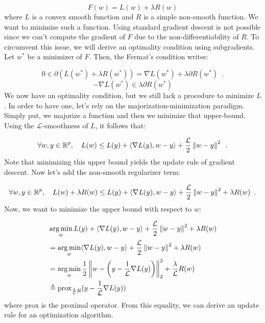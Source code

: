 \documentclass[a4paper,10pt]{article}
\theoremstyle{definition}
\begin{document}
\begin{equation*}
    F(w) = L(w) + \lambda R(w)
\end{equation*}
%
where $L$ is a convex smooth function and $R$ is a simple non-smooth function. We want to
minimize such a function. Using standard gradient descent is not possible since we can't compute the
gradient of $F$ due to the non-differentiability of $R$. To circumvent this issue, we will derive an
optimality condition using subgradients. Let $w^*$ be a minimizer of $F$. Then, the Fermat's condition
writes:

\begin{equation*}
    0 \in \partial 
    \left(
        L(w^*) + \lambda R(w^*)
    \right) 
    = \nabla L(w^*) + \lambda \partial R(w^*)
    \enspace .
\end{equation*}
%
\begin{equation*}
    - \nabla L(w^*) \in \lambda \partial R(w^*)
\end{equation*}
%
We now have an optimality condition, but we still lack a procedure to minimize $L$. 
In order to have one, let's rely on the majorization-minimization paradigm. Simply put, 
we majorize a function and then we minimize that upper-bound. Using the $\mathcal{L}$-smoothness
of $L$, it follows that:

\begin{equation*}
    \forall w, y \in \mathbb{R}^p,
    \quad
    L(w) \leq L(y) + 
    \langle
        \nabla L(y),
        w-y
    \rangle +
    \frac{\mathcal{L}}{2} 
    \left \lVert w - y \right \rVert^2
    \enspace .
\end{equation*}
%
Note that minimizing this upper bound yields the update rule of gradient descent. Now let's add
the non-smooth regularizer term:

\begin{equation*}
    \forall w, y \in \mathbb{R}^p,
    \quad
    L(w) + \lambda R(w) \leq L(y) + 
    \langle
        \nabla L(y),
        w-y
    \rangle +
    \frac{\mathcal{L}}{2} 
    \left \lVert w - y \right \rVert^2 
    + \lambda R(w) 
    \enspace .
\end{equation*}
%
Now, we want to minimize the upper bound with respect to $w$:

\begin{align*}
    &\operatorname*{arg\,min}_{w} L(y) + 
    \langle
        \nabla L(y),
        w-y
    \rangle +
    \frac{\mathcal{L}}{2} 
    \left \lVert w - y \right \rVert^2 
    + \lambda R(w) \\
    &= \operatorname*{arg\,min}_{w}
    \langle
        \nabla L(y),
        w-y
    \rangle +
    \frac{\mathcal{L}}{2} 
    \left \lVert w - y \right \rVert^2 
    + \lambda R(w) \\
    &= \operatorname*{arg\,min}_{w}
    \frac{1}{2}
    \left \lVert 
        w - \left(
            y - \frac{1}{\mathcal{L}}\nabla L(y)
        \right)
     \right \rVert^2_2 
    + \frac{\lambda}{\mathcal{L}}R(w) \\
    &\triangleq \text{prox}_{\frac{\lambda}{\mathcal{L}}R}
    (y - \frac{1}{\mathcal{L}}\nabla L(y))
\end{align*}
%
where $\text{prox}$ is the proximal operator. From this equality, we can derive an update
rule for an optimization algorithm.
\end{document}
